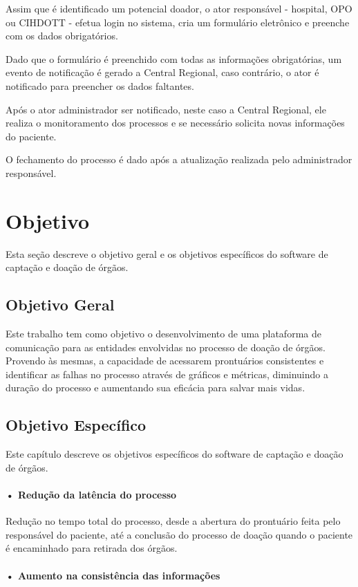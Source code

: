 \documentclass[portuguese,oneside]{tcc}
\begin{document}
Assim que é identificado um potencial doador, o ator responsável - hospital, OPO ou CIHDOTT - efetua login no sistema, cria um formulário eletrônico e preenche com os dados obrigatórios.

Dado que o formulário é preenchido com todas as informações obrigatórias, um evento de notificação é gerado a Central Regional, caso contrário, o ator é notificado para preencher os dados faltantes.

Após o ator administrador ser notificado, neste caso a Central Regional, ele realiza o monitoramento dos processos e se necessário solicita novas informações do paciente.

O fechamento do processo é dado após a atualização realizada pelo administrador responsável.

\section{Objetivo}
Esta seção descreve o objetivo geral e os objetivos específicos do software de captação e doação de órgãos.


\subsection{Objetivo Geral}
Este trabalho tem como objetivo o desenvolvimento de uma plataforma de comunicação para as entidades envolvidas no processo de doação de órgãos. Provendo às mesmas, a capacidade de acessarem prontuários consistentes e identificar as falhas no processo através de gráficos e métricas, diminuindo a duração do processo e aumentando sua eficácia para salvar mais vidas.


\subsection{Objetivo Específico}
Este capítulo descreve os objetivos específicos do software de captação e doação de órgãos.

\paragraph*{• Redução da latência do processo}

Redução no tempo total do processo, desde a abertura do prontuário feita pelo responsável do paciente, até a conclusão do processo de doação quando o paciente é encaminhado para retirada dos órgãos.

\paragraph*{• Aumento na consistência das informações}
\end{document}
